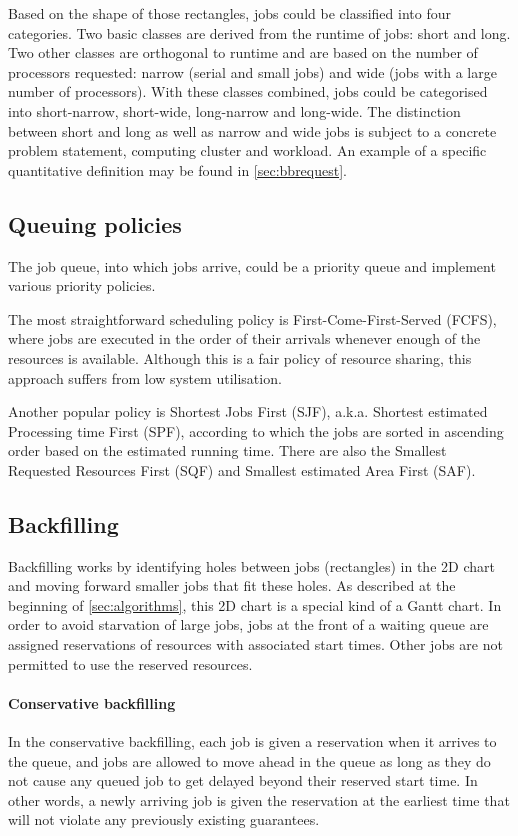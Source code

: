 \documentclass[thesis-en.tex]{subfiles}
\begin{document}
Based on the shape of those rectangles, jobs could be classified into four categories. Two basic classes are derived from the runtime of jobs: short and long. Two other classes are orthogonal to runtime and are based on the number of processors requested: narrow (serial and small jobs) and wide (jobs with a large number of processors). With these classes combined, jobs could be categorised into short-narrow, short-wide, long-narrow and long-wide. The distinction between short and long as well as narrow and wide jobs is subject to a concrete problem statement, computing cluster and workload. An example of a specific quantitative definition may be found in \autoref{sec:bbrequest}.

\subsection{Queuing policies}
The job queue, into which jobs arrive, could be a priority queue and implement various priority policies.

The most straightforward scheduling policy is First-Come-First-Served (FCFS), where jobs are executed in the order of their arrivals whenever enough of the resources is available. Although this is a fair policy of resource sharing, this approach suffers from low system utilisation.

Another popular policy is Shortest Jobs First (SJF), a.k.a. Shortest estimated Processing time First (SPF), according to which the jobs are sorted in ascending order based on the estimated running time. There are also the Smallest Requested Resources First (SQF) and Smallest estimated Area First (SAF).

\subsection{Backfilling}
Backfilling works by identifying holes between jobs (rectangles) in the 2D chart and moving forward smaller jobs that fit these holes. As described at the beginning of \autoref{sec:algorithms}, this 2D chart is a special kind of a Gantt chart. In order to avoid starvation of large jobs, jobs at the front of a waiting queue are assigned reservations of resources with associated start times. Other jobs are not permitted to use the reserved resources.

\paragraph{Conservative backfilling}
In the conservative backfilling, each job is given a reservation when it arrives to the queue, and jobs are allowed to move ahead in the queue as long as they do not cause any queued job to get delayed beyond their reserved start time. In other words, a newly arriving job is given the reservation at the earliest time that will not violate any previously existing guarantees. 
\end{document}
